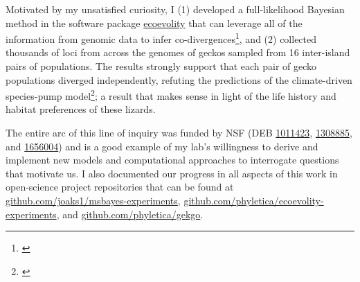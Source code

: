 Motivated by my unsatisfied curiosity, I
(1) developed a full-likelihood Bayesian method in the software package
\href{http://phyletica.org/ecoevolity/}{ecoevolity}
that can leverage all of the information from genomic data to infer
co-divergences\footnote{\label{Oaks18ecoevolity}\hspace{-0.8em}},
and
(2) collected thousands of loci from across the genomes of geckos sampled from
16 inter-island pairs of populations.
The results strongly support that each pair of gecko populations diverged
independently, refuting the predictions of the climate-driven species-pump
model\footnote{\label{Oaks18paic}\hspace{-0.8em}};
a result that makes sense in light of the life history and habitat
preferences of these lizards.

The entire arc of this line of inquiry was funded by NSF
(DEB
\href{https://www.nsf.gov/awardsearch/showAward?AWD_ID=1011423}{1011423},
\href{https://www.nsf.gov/awardsearch/showAward?AWD_ID=1308885}{1308885},
and
\href{https://www.nsf.gov/awardsearch/showAward?AWD_ID=1656004}{1656004})
and is a good example of my lab's willingness to derive and implement new
models and computational approaches to interrogate questions that motivate us.
I also documented our progress in all aspects of this work in open-science
project repositories that can be found at
\href{https://github.com/joaks1/msbayes-experiments}{github.com/joaks1/msbayes-experiments},
\href{https://github.com/phyletica/ecoevolity-experiments}{github.com/phyletica/ecoevolity-experiments},
and
\href{https://github.com/phyletica/gekgo}{github.com/phyletica/gekgo}.






